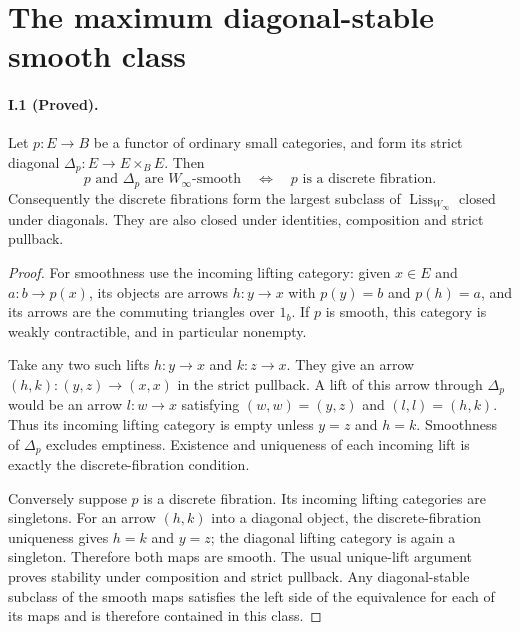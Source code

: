 \section{The maximum diagonal-stable smooth class}

\paragraph{I.1 (Proved).}
Let $p:E\to B$ be a functor of ordinary small categories, and form
its strict diagonal $\Delta_p:E\to E\times_B E$. Then
\[
 p\text{ and }\Delta_p\text{ are }W_\infty\text{-smooth}
 \quad\Longleftrightarrow\quad
 p\text{ is a discrete fibration}.
\]
Consequently the discrete fibrations form the largest subclass of
$\operatorname{Liss}_{W_\infty}$ closed under diagonals. They are also
closed under identities, composition and strict pullback.
\begin{proof}
For smoothness use the incoming lifting category: given $x\in E$
and $a:b\to p(x)$, its objects are arrows $h:y\to x$ with
$p(y)=b$ and $p(h)=a$, and its arrows are the commuting triangles
over $1_b$. If $p$ is smooth, this category is weakly contractible,
and in particular nonempty.

Take any two such lifts $h:y\to x$ and $k:z\to x$. They give an
arrow $(h,k):(y,z)\to(x,x)$ in the strict pullback. A lift of this
arrow through $\Delta_p$ would be an arrow $l:w\to x$ satisfying
$(w,w)=(y,z)$ and $(l,l)=(h,k)$. Thus its incoming lifting category
is empty unless $y=z$ and $h=k$. Smoothness of $\Delta_p$ excludes
emptiness. Existence and uniqueness of each incoming lift is exactly
the discrete-fibration condition.

Conversely suppose $p$ is a discrete fibration. Its incoming lifting
categories are singletons. For an arrow $(h,k)$ into a diagonal
object, the discrete-fibration uniqueness gives $h=k$ and $y=z$;
the diagonal lifting category is again a singleton. Therefore both
maps are smooth. The usual unique-lift argument proves stability
under composition and strict pullback. Any diagonal-stable subclass
of the smooth maps satisfies the left side of the equivalence for
each of its maps and is therefore contained in this class.
\end{proof}


